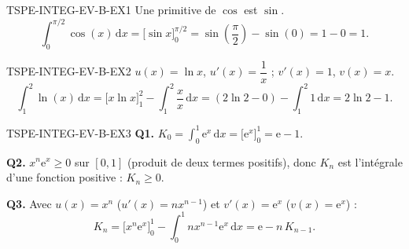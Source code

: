 %
\begin{corrige}{TSPE-INTEG-EV-B-EX1}
Une primitive de $\cos$ est $\sin$.
\[
  \int_0^{\pi/2} \cos(x)\,\mathrm{d}x = \big[\sin x\big]_0^{\pi/2} = \sin\!\left(\frac{\pi}{2}\right) - \sin(0) = 1-0 = \boxed{1}.
\]
\end{corrige}

\begin{corrige}{TSPE-INTEG-EV-B-EX2}
$u(x)=\ln x$, $u'(x)=\dfrac{1}{x}$ ; $v'(x)=1$, $v(x)=x$.
\[
  \int_1^2 \ln(x)\,\mathrm{d}x = \big[x\ln x\big]_1^2 - \int_1^2 \frac{x}{x}\,\mathrm{d}x = (2\ln 2 - 0) - \int_1^2 1\,\mathrm{d}x = 2\ln 2 - 1.
\]
\end{corrige}

\begin{corrige}{TSPE-INTEG-EV-B-EX3}
\textbf{Q1.} $K_0 = \displaystyle\int_0^1 \mathrm{e}^x\,\mathrm{d}x = \big[\mathrm{e}^x\big]_0^1 = \mathrm{e}-1$.

\textbf{Q2.} $x^n\mathrm{e}^x \geq 0$ sur $[0,1]$ (produit de deux termes positifs), donc $K_n$ est l'intégrale d'une fonction positive : $K_n \geq 0$.

\textbf{Q3.} Avec $u(x)=x^n$ ($u'(x)=nx^{n-1}$) et $v'(x)=\mathrm{e}^x$ ($v(x)=\mathrm{e}^x$) :
\[
  K_n = \big[x^n\mathrm{e}^x\big]_0^1 - \int_0^1 nx^{n-1}\mathrm{e}^x\,\mathrm{d}x = \mathrm{e} - n\,K_{n-1}.
\]
\end{corrige}

